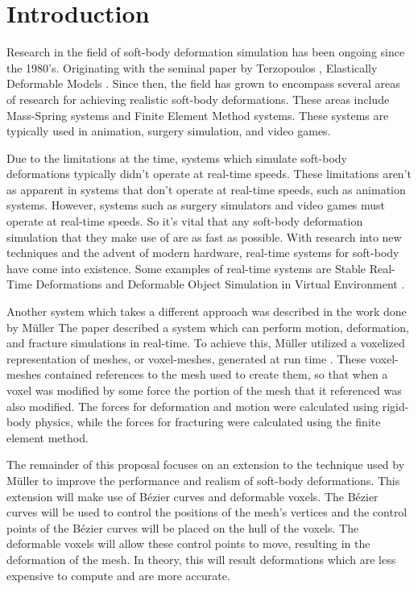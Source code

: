 \chapter{Introduction}

Research in the field of soft-body deformation simulation has been ongoing since the 1980's. 
Originating with the seminal paper by Terzopoulos \etal, Elastically Deformable Models 
\cite{Elastically-Deformable-Models}. Since then, the field has 
grown to encompass several areas of research for achieving realistic soft-body deformations. These
areas include Mass-Spring systems and Finite Element Method systems. 
These systems are typically
used in animation, surgery simulation, and video games.

Due to the limitations at the time, systems which simulate soft-body deformations typically didn't
operate at real-time speeds. These limitations aren't as apparent in systems that don't operate at
real-time speeds, such as animation systems. However, systems such as surgery simulators and video
games must operate at real-time speeds. So it's vital that any soft-body deformation simulation that
they make use of are as fast as possible. With research into new techniques and the advent of modern
hardware, real-time systems for soft-body have come into existence. Some examples of real-time 
systems are Stable Real-Time Deformations \cite{Stable-Real-Time-Deformations} and Deformable Object 
Simulation in Virtual Environment \cite{Deformable-Object-Simulation-in-Virtual-Environment}.

Another system which takes a different approach was described in the work done by Müller \etal The 
paper described a system which can perform motion, deformation, and fracture 
simulations in real-time. To achieve this, Müller \etal utilized a voxelized representation of 
meshes, or voxel-meshes, generated at run time \cite{Muller_Teschner_Gross}. These voxel-meshes 
contained references
to the mesh used to create them, so that when a voxel  was modified by some force the portion of 
the mesh that it referenced was also modified. The forces for deformation and motion were calculated 
using rigid-body physics, while the forces for fracturing were calculated using the finite element 
method. 

The remainder of this proposal focuses on an extension to the technique used by Müller \etal
to improve the performance and realism of soft-body deformations. This extension will make use of 
Bézier curves and deformable voxels. The Bézier curves will be used to control the positions of the
mesh's vertices and the control points of the Bézier curves will be placed on the hull of the voxels.
The deformable voxels will allow these control points to move, resulting in the deformation of the 
mesh. In theory, this will result deformations which are less expensive to compute and are more 
accurate.



